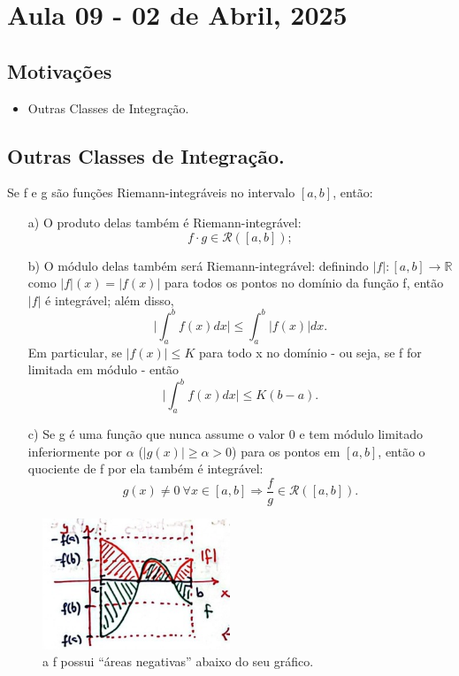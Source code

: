 \documentclass[../analysisII_notes.tex]{subfiles}
\begin{document}
\section{Aula 09 - 02 de Abril, 2025}
\subsection{Motivações}
\begin{itemize}
	\item Outras Classes de Integração.
\end{itemize}
\subsection{Outras Classes de Integração.}
\begin{prop*}
	Se f e g são funções Riemann-integráveis no intervalo \([a, b]\), então:
	\begin{itemize}
		\item[a)] O produto delas também é Riemann-integrável:
		      \[
			      f \cdot g\in \mathcal{R}([a, b]);
		      \]
		\item[b)] O módulo delas também será Riemann-integrável: definindo \(|f|:[a, b]\rightarrow \mathbb{R}\) como \(|f|(x)=|f(x)|\) para todos os pontos no domínio da função f, então \(|f|\) é integrável; além disso,
		      \[
			      \biggl\vert \int_{a}^{b}f(x)dx \biggr\vert\leq \int_{a}^{b}|f(x)|dx.
		      \]
		      Em particular, se \(|f(x)|\leq K\) para todo x no domínio - ou seja, se f for limitada em módulo - então
		      \[
			      \biggl\vert \int_{a}^{b}f(x)dx \biggr\vert\leq K(b-a).
		      \]
		\item[c)] Se g é uma função que nunca assume o valor 0 e tem módulo limitado inferiormente por \(\alpha \) (\(|g(x)|\geq \alpha > 0\)) para os pontos em \([a, b]\), então o quociente de f por ela também é integrável:
		      \[
			      g(x)\neq 0 \: \forall x\in [a, b] \Rightarrow \frac{f}{g}\in \mathcal{R}([a, b]).
		      \]
	\end{itemize}
\end{prop*}
\begin{figure}[H]
	\begin{center}
		\includegraphics[height=0.5\textheight, width=0.5\textwidth, keepaspectratio]{./Images/unbound_modulus_08.png}
	\end{center}
	\caption{a f possui ``áreas negativas'' abaixo do seu gráfico.}
	\label{unbmod08}
\end{figure}
\end{document}
